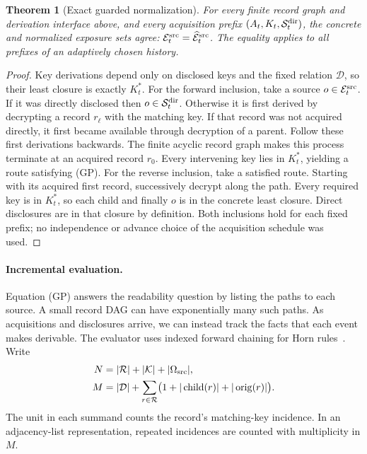 \documentclass[pdflatex]{sn-jnl}
\theoremstyle{thmstyleone}
\newtheorem{theorem}{Theorem}[section]
\theoremstyle{thmstylethree}
\theoremstyle{thmstyletwo}
\begin{document}
\begin{theorem}[Exact guarded normalization]
\label{thm:guarded-normalization}
For every finite record graph and derivation interface above, and every
acquisition prefix $(A_t,K_t,\mathcal S^{\rm dir}_t)$, the concrete and normalized exposure
sets agree: $\mathcal E^{\rm src}_t=\widehat{\mathcal E}^{\rm src}_t$.  The equality applies to all prefixes of
an adaptively chosen history.
\end{theorem}
\begin{proof}
Key derivations depend only on disclosed keys and the fixed relation
$\mathcal D$, so their least closure is exactly $K_t^*$.
For the forward inclusion, take a source $o\in \mathcal E^{\rm src}_t$.
If it was directly disclosed then $o\in \mathcal S^{\rm dir}_t$.
Otherwise it is first derived by decrypting a record $r_\ell$ with the
matching key. If that record was not acquired directly, it first became
available through decryption of a parent. Follow these first
derivations backwards.  The finite acyclic record graph makes this
process terminate at an acquired record $r_0$.  Every intervening key
lies in $K_t^*$, yielding a route satisfying (GP).
For the reverse inclusion, take a satisfied route.  Starting with its
acquired first record, successively decrypt along the path.  Every
required key is in $K_t^*$, so each child and finally $o$ is in the
concrete least closure.  Direct disclosures are in that closure by
definition.  Both inclusions hold for each fixed prefix; no independence
or advance choice of the acquisition schedule was used.
\end{proof}

\paragraph{Incremental evaluation.}
Equation (GP) answers the readability question by listing the paths to
each source. A small record DAG can have exponentially many such paths.
As acquisitions and disclosures arrive, we can instead track the facts
that each event makes derivable. The evaluator uses indexed forward
chaining for Horn rules~\cite[Section~4]{dowlingGallier1984}.
Write
\[
\begin{aligned}
 N&=|\mathcal R|+|\mathcal K|+|\Omega_{\rm src}|,\\
 M&=|\mathcal D|+\sum_{r\in\mathcal R}
       \bigl(1+|\operatorname{child}(r)|+|\operatorname{orig}(r)|\bigr).
\end{aligned}
\]
The unit in each summand counts the record's matching-key incidence.
In an adjacency-list representation, repeated incidences are counted with
multiplicity in $M$.
\end{document}
